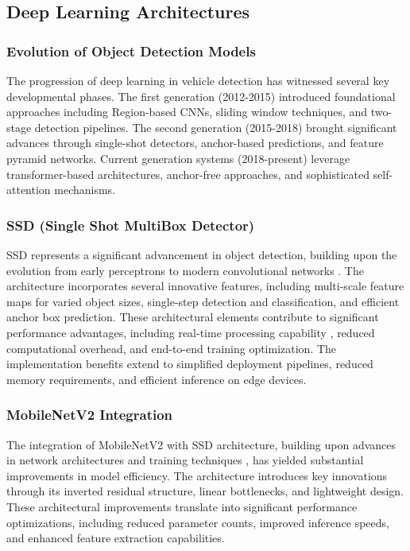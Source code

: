 \subsection{Deep Learning Architectures}

\subsubsection{Evolution of Object Detection Models}
The progression of deep learning in vehicle detection has witnessed several key developmental phases. The first generation (2012-2015) introduced foundational approaches including Region-based CNNs, sliding window techniques, and two-stage detection pipelines. The second generation (2015-2018) brought significant advances through single-shot detectors, anchor-based predictions, and feature pyramid networks. Current generation systems (2018-present) leverage transformer-based architectures, anchor-free approaches, and sophisticated self-attention mechanisms.

\subsubsection{SSD (Single Shot MultiBox Detector)}
SSD \cite{Chen2022Fast} represents a significant advancement in object detection, building upon the evolution from early perceptrons \cite{rosenblatt1958perceptron} to modern convolutional networks \cite{yannlecun1998}. The architecture incorporates several innovative features, including multi-scale feature maps for varied object sizes, single-step detection and classification, and efficient anchor box prediction. These architectural elements contribute to significant performance advantages, including real-time processing capability \cite{Rahmaniar2021Real-Time}, reduced computational overhead, and end-to-end training optimization. The implementation benefits extend to simplified deployment pipelines, reduced memory requirements, and efficient inference on edge devices.

\subsubsection{MobileNetV2 Integration}
The integration of MobileNetV2 with SSD architecture, building upon advances in network architectures \cite{kaiminghe2015, szegedy2015} and training techniques \cite{ioffe2015}, has yielded substantial improvements in model efficiency. The architecture introduces key innovations through its inverted residual structure, linear bottlenecks, and lightweight design. These architectural improvements translate into significant performance optimizations, including reduced parameter counts, improved inference speeds, and enhanced feature extraction capabilities.

